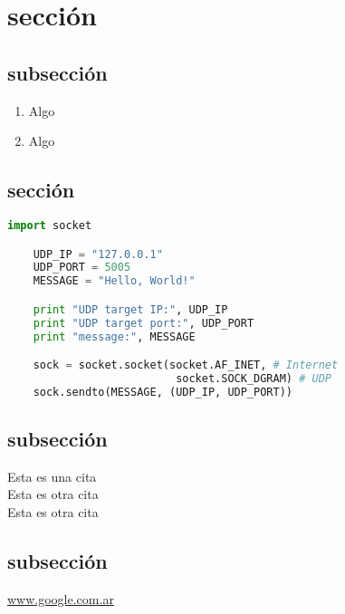 \section{secci\'on}
\subsection{subsecci\'on}
  \begin{enumerate}
    \item Algo
    \item Algo
  \end{enumerate}

\subsection{secci\'on}
  \begin{lstlisting}[language=Python]
    import socket

    UDP_IP = "127.0.0.1"
    UDP_PORT = 5005
    MESSAGE = "Hello, World!"

    print "UDP target IP:", UDP_IP
    print "UDP target port:", UDP_PORT
    print "message:", MESSAGE

    sock = socket.socket(socket.AF_INET, # Internet
                          socket.SOCK_DGRAM) # UDP
    sock.sendto(MESSAGE, (UDP_IP, UDP_PORT))
  \end{lstlisting}

\subsection{subsecci\'on}
  \noindent
  Esta es una cita \cite{einstein}\\
  Esta es otra cita \cite{dirac}\\
  Esta es otra cita \cite{knuthwebsite}\\

\subsection{subsecci\'on}
  \noindent
  \url{www.google.com.ar}

